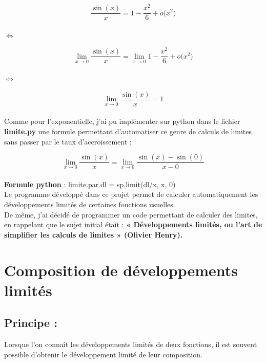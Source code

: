 \documentclass{article}
\begin{document}
$$\boxed{\frac{\sin(x)}{x}=1-\frac{x^2}{6}+o\big(x^2\big)}$$ \\

$\Leftrightarrow$ 

 $$\boxed{\lim_{x \to 0} \frac{\sin(x)}{x} = \lim_{x \to 0} 1-\frac{x^2}{6}+o\big(x^2\big) }$$ \\

$\Leftrightarrow$ 

$$\boxed{\lim_{x \to 0} \frac{\sin(x)}{x} =1}$$ \\
Comme pour l'exponentielle, j'ai pu implémenter sur python dans le fichier \textbf{limite.py} une formule permettant d'automatiser ce genre de calculs de limites sans passer par le taux d'accroissement : 

$$\boxed{\lim_{x \to 0} \frac{\sin(x)}{x} =\lim_{x \to 0}\frac{\sin(x)-\sin(0)}{x-0}}$$\\
\textbf{Formule python} : limite.par.dl = sp.limit(dl/x, x, 0) \\

Le programme développé dans ce projet permet de calculer automatiquement les développements limités de certaines fonctions usuelles. \\
De même, j’ai décidé de programmer un code permettant de calculer des limites, en rappelant que le sujet initial était : \textbf{« Développements limités, ou l’art de simplifier les calculs de limites » (Olivier Henry).}

\section{Composition de développements limités}

\subsection{Principe :}
Lorsque l’on connaît les développements limités de deux fonctions, il est souvent possible d’obtenir le développement limité de leur composition. \\
 \\
\end{document}
